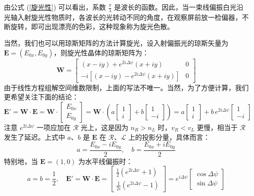 \documentclass[UTF8]{report}
\theoremstyle{MyLineTheoremStyle} %
\theoremstyle{MyBlockTheoremStyle} %
\theoremstyle{MySubsubsectionStyle} %
\begin{document}
由公式 (\ref{旋光性}) 可以看出，系数 $\frac{\pi}{\lambda}$ 是波长的函数。因此，当一束线偏振白光沿光轴入射旋光性物质时，各波长的光转动不同的角度，在观察屏前放一检偏器，不断旋转，即可出现漂亮的色彩，这种现象称为旋光色散。

当然，我们也可以用琼斯矩阵的方法计算旋光，设入射偏振光的琼斯矢量为 $\boldsymbol{E} = (E_{0x}, E_{0y})$，则旋光性晶体的琼斯矩阵为：
\begin{equation}
\boldsymbol{W} = 
\begin{bmatrix}
    (x - iy) + e^{2 i \Delta \psi} (x + iy)  & 0\\ 
    -i \left[ (x - iy) - e^{2 i \Delta \psi} (x + iy) \right] & 0
\end{bmatrix}
\end{equation}
由于线性方程组解空间维数限制，上面的写法不唯一。当然，为了方便计算，我们更希望关注下面的结论：
\begin{equation}
    \boldsymbol{E'} = 
    \boldsymbol{W}\cdot\boldsymbol{E} = 
    \boldsymbol{W}\cdot \begin{bmatrix}
        E_{0x} \\
        E_{0y}
    \end{bmatrix}
    = 
    \boldsymbol{W} \cdot\left( a \begin{bmatrix}
        1 \\
        i
    \end{bmatrix} + 
    b \begin{bmatrix}
        1 \\
        -i
    \end{bmatrix} 
    \right)
    = 
    a \begin{bmatrix}
        1 \\
        i
    \end{bmatrix} +
    b \, e^{2 i \Delta \psi}\begin{bmatrix}
        1 \\
        -i
    \end{bmatrix}
\end{equation}
注意 $e^{2 i \Delta \psi}$ 一项应加在 $\mathscr{R}$ 光上，这是因为 $n_R > n_L$ 时，$v_R < v_L$ 更慢，相当于 $\mathscr{R}$ 发生了延迟。上式中 $a$、$b$ 是 $\boldsymbol{E}$ 在 $\mathscr{R}$、$\mathscr{L}$ 上的投影分量，具体而言：
\begin{equation}
a = \frac{E_{0x} - i E_{0y}}{2},\quad b = \frac{E_{0x} + i E_{0y}}{2}
\end{equation}
特别地，当 $\boldsymbol{E} = (1, 0)$ 为水平线偏振时：
\begin{equation}
a = b = \frac{1}{2},\quad \boldsymbol{E'} = \boldsymbol{W}\cdot \boldsymbol{E} = 
\begin{bmatrix}
    \frac{1}{2}\left(e^{2 i \Delta \psi} + 1\right) \\
    \frac{1}{2i}(e^{2 i \Delta \psi} - 1)
\end{bmatrix}
=
e^{i \Delta \psi}
\begin{bmatrix}
    \cos \Delta \psi \\
    \sin \Delta \psi
\end{bmatrix}
\end{equation}
\end{document}
